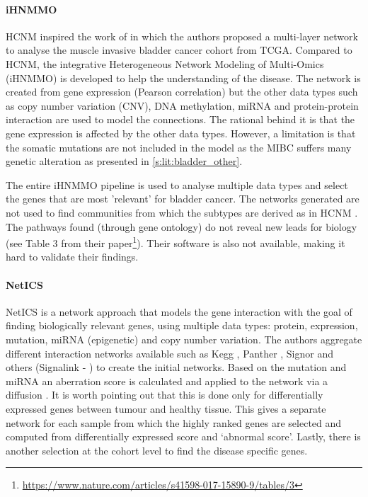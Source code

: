 \paragraph*{iHNMMO} \label{s:lit:iHNMMO}

HCNM inspired the work of \citet{Peng2017-ik} in which the authors proposed a multi-layer network to analyse the muscle invasive bladder cancer cohort from TCGA. Compared to HCNM, the integrative Heterogeneous Network Modeling of Multi-Omics (iHNMMO) is developed to help the understanding of the disease. The network is created from gene expression (Pearson correlation) but the other data types such as copy number variation (CNV), DNA methylation, miRNA and protein-protein interaction are used to model the connections. The rational behind it is that the gene expression is affected by the other data types. However, a limitation is that the somatic mutations are not included in the model as the MIBC suffers many genetic alteration as presented in \cref{s:lit:bladder_other}.

The entire iHNMMO pipeline is used to analyse multiple data types and select the genes that are most 'relevant' for bladder cancer. The networks generated are not used to find communities from which the subtypes are derived as in HCNM \citep{Vangimalla2021-fc, Care2019-ij}. The pathways found (through gene ontology) do not reveal new leads for biology (see Table 3 from their paper\footnote{\url{https://www.nature.com/articles/s41598-017-15890-9/tables/3}}). Their software is also not available, making it hard to validate their findings.

\paragraph*{NetICS} \label{s:lit:netICS}

NetICS \citep{Dimitrakopoulos2018-br} is a network approach that models the gene interaction with the goal of finding biologically relevant genes, using multiple data types: protein, expression, mutation, miRNA (epigenetic) and copy number variation. The authors aggregate different interaction networks available such as Kegg \citep{Kanehisa2017-wj}, Panther \citep{Thomas2022-kn}, Signor \citep{Perfetto2016-tw} and others (Signalink - \cite{Fazekas2013-qh, Wu2010-ap}) to create the initial networks. Based on the mutation and miRNA an aberration score is calculated and applied to the network via a diffusion \citep{Leiserson2015-kv}. It is worth pointing out that this is done only for differentially expressed genes between tumour and healthy tissue. This gives a separate network for each sample from which the highly ranked genes are selected and computed from differentially expressed score and ‘abnormal score’. Lastly, there is another selection at the cohort level to find the disease specific genes.

